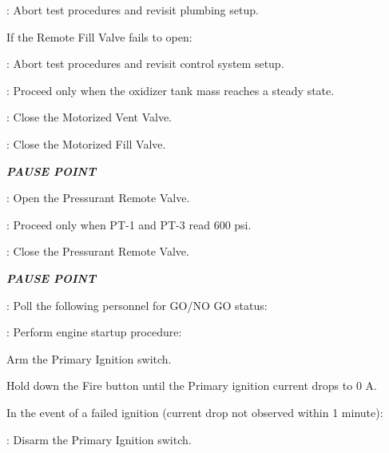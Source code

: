\begin{checklist}
\begin{checklist}[label=$\bullet$]
\begin{checklist}
            \item \ops{}: Abort test procedures and revisit plumbing setup.
        \end{checklist}
        \item If the Remote Fill Valve fails to open:
        \begin{checklist}
            \item \ops{}: Abort test procedures and revisit control system setup.
        \end{checklist}
    \end{checklist}
    \item \daq{}: Proceed only when the oxidizer tank mass reaches a steady state.
    \item \control{}: Close the Motorized Vent Valve.
    \item \control{}: Close the Motorized Fill Valve.
    \item \textbf{\textit{PAUSE POINT}}
    \item \control{}: Open the Pressurant Remote Valve.
    \item \daq{}: Proceed only when PT-1 and PT-3 read 600 psi.
    \item \control{}: Close the Pressurant Remote Valve.
    \item \textbf{\textit{PAUSE POINT}}
    \item \ops{}: Poll the following personnel for GO/NO GO status:
    \begin{checklist}
        \item \primary{}
        \item \secondary{}
        \item \daq{}
        \item \control{}
    \end{checklist}
    \item \control{}: Perform engine startup procedure:
    \begin{checklist}
        \item Arm the Primary Ignition switch.
        \item Hold down the Fire button until the Primary ignition current drops to 0 A.
        \begin{checklist}[label=$\bullet$]
            \item In the event of a failed ignition (current drop not observed within 1 minute):
            \begin{checklist}
                \item \control{}: Disarm the Primary Ignition switch.

\end{checklist}
\end{checklist}
\end{checklist}
\end{checklist}
